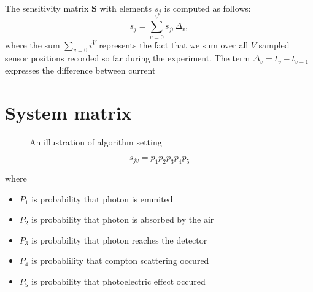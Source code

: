 The sensitivity matrix $\mathbf{S}$ with elements $s_{j}$ is computed as follows:
\begin{equation}
  s_{j} = \sum_{v = 0}^{V} s_{jv} \Delta_{v}, 
\end{equation}
where the sum $\sum_{v = 0}i^{V}$ represents the fact that we sum over all $V$ sampled sensor positions recorded so far during the experiment. 
The term $\Delta_{v} = t_{v} - t_{v-1}$ expresses the difference between current 



\section{System matrix}
\begin{figure}[!h]
  \centering

  \caption{An illustration of algorithm setting}
\end{figure}


\begin{equation}
  s_{jv} =  p_{1}p_{2}p_{3}p_{4}p_{5}
\end{equation}

where 
\begin{itemize}
  \item $P_{1}$ is probability that photon is emmited
  \item $P_{2}$ is probability that photon is absorbed by the air
  \item $P_{3}$ is probability that photon reaches the detector
  \item $P_{4}$ is probablility that compton scattering occured
  \item $P_{5}$ is probability that photoelectric effect occured
\end{itemize}






